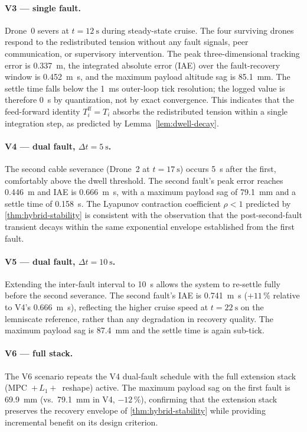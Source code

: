 \paragraph{V3 --- single fault.} Drone~0 severs at $t = \SI{12}{\second}$ during steady-state cruise. The four surviving drones respond to the redistributed tension without any fault signals, peer communication, or supervisory intervention. The peak three-dimensional tracking error is \SI{0.337}{\metre}, the integrated absolute error (IAE) over the fault-recovery window is \SI{0.452}{\metre\second}, and the maximum payload altitude sag is \SI{85.1}{\milli\metre}. The settle time falls below the \SI{1}{\milli\second} outer-loop tick resolution; the logged value is therefore \SI{0}{\second} by quantization, not by exact convergence. This indicates that the feed-forward identity $T_i^{\mathrm{ff}} = T_i$ absorbs the redistributed tension within a single integration step, as predicted by Lemma~\ref{lem:dwell-decay}.

\paragraph{V4 --- dual fault, $\Delta t = \SI{5}{\second}$.} The second cable severance (Drone~2 at $t = \SI{17}{\second}$) occurs \SI{5}{\second} after the first, comfortably above the dwell threshold. The second fault's peak error reaches \SI{0.446}{\metre} and IAE is \SI{0.666}{\metre\second}, with a maximum payload sag of \SI{79.1}{\milli\metre} and a settle time of \SI{0.158}{\second}. The Lyapunov contraction coefficient $\rho < 1$ predicted by \cref{thm:hybrid-stability} is consistent with the observation that the post-second-fault transient decays within the same exponential envelope established from the first fault.

\paragraph{V5 --- dual fault, $\Delta t = \SI{10}{\second}$.} Extending the inter-fault interval to \SI{10}{\second} allows the system to re-settle fully before the second severance. The second fault's IAE is \SI{0.741}{\metre\second} ($+11\,\%$ relative to V4's \SI{0.666}{\metre\second}), reflecting the higher cruise speed at $t = \SI{22}{\second}$ on the lemniscate reference, rather than any degradation in recovery quality. The maximum payload sag is \SI{87.4}{\milli\metre} and the settle time is again sub-tick.

\paragraph{V6 --- full stack.} The V6 scenario repeats the V4 dual-fault schedule with the full extension stack (MPC~$+\,L_1+$~reshape) active. The maximum payload sag on the first fault is \SI{69.9}{\milli\metre} (vs.\ \SI{79.1}{\milli\metre} in V4, $-12\,\%$), confirming that the extension stack preserves the recovery envelope of \cref{thm:hybrid-stability} while providing incremental benefit on its design criterion.

